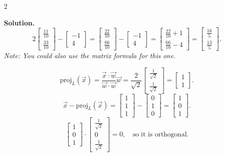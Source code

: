 \documentclass[8pt]{extarticle}
\begin{document}
\begin{multicols}{2}
\begin{tcolorbox}[title=]
\textbf{Solution.}
\[
2\begin{bmatrix}\frac{11}{10}\\[2pt]\frac{33}{10}\end{bmatrix}
-
\begin{bmatrix}-1\\[2pt]4\end{bmatrix}
=
\begin{bmatrix}\frac{22}{10}\\[2pt]\frac{66}{10}\end{bmatrix}
-
\begin{bmatrix}-1\\[2pt]4\end{bmatrix}
=
\begin{bmatrix}\frac{22}{10}+1\\[2pt]\frac{66}{10}-4\end{bmatrix}
=
\begin{bmatrix}\frac{16}{5}\\[2pt]\frac{13}{5}\end{bmatrix}.
\]
\textit{Note: You could also use the matrix formula for this one.}

\[
\mathrm{proj}_{L}(\vec{x})
=\frac{\vec{x}\cdot\vec{w}}{\vec{w}\cdot\vec{w}}\vec{w}
= \frac{2}{\sqrt{2}}
\begin{bmatrix}\frac{1}{\sqrt{2}}\\[2pt]\frac{1}{\sqrt{2}}\end{bmatrix}
= \begin{bmatrix}1\\1\end{bmatrix}.
\]
\[
\vec{x}-\mathrm{proj}_{L}(\vec{x})
=\begin{bmatrix}1\\1\\1\end{bmatrix}
-\begin{bmatrix}0\\1\\0\end{bmatrix}
=\begin{bmatrix}1\\0\\1\end{bmatrix}.
\]
\[
\begin{bmatrix}1\\0\\1\end{bmatrix}\cdot
\begin{bmatrix}\tfrac1{\sqrt{2}}\\[2pt]0\\[2pt]\tfrac1{\sqrt{2}}\end{bmatrix}=0,
\quad \text{so it is orthogonal.}
\]
\end{tcolorbox}


\end{multicols}
\end{document}
